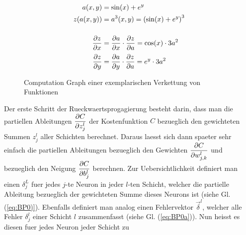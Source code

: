 \begin{figure}[h!]
  \begin{minipage}[h!]{0.5\textwidth}
    \centering

  \end{minipage}
  \begin{minipage}[h!]{0.5\textwidth}
    \begin{align*} %
      a(x,y) &= \sin(x) + e^y \\
      z(a(x,y)) &= a^3(x,y) = \left(\sin(x) + e^y\right)^3 \\[3ex]
      \partderiv{z}{x} &= \partderiv{a}{x} \cdot  \partderiv{z}{a} = \cos(x) \cdot 3a^2 \\[0.5ex]
      \partderiv{z}{y} &= \partderiv{a}{y} \cdot \partderiv{z}{a} = e^y \cdot 3a^2
    \end{align*}
  \end{minipage}

  \caption{Computation Graph einer exemplarischen Verkettung von Funktionen}
  \label{fig:computation_graph}
\end{figure}
\para{}
Der erste Schritt der Rueckwaertsprogagierung besteht darin, dass man die partiellen Ableitungen $\displaystyle\frac{\partial C}{\partial z_j^l}$
der Kostenfunktion $C$ bezueglich den gewichteten Summen $z_j^l$ aller Schichten
berechnet. Daraus laesst sich dann spaeter sehr einfach die partiellen Ableitungen
bezueglich den Gewichten $\displaystyle\frac{\partial C}{\partial w_{j,k}^l}$ und bezueglich den Neigung
$\displaystyle\frac{\partial C}{\partial b_j^l}$ berechnen.
\para{}
Zur Uebersichtlichkeit definiert man einen  $\delta_j^L$ fuer
jedes $j$-te Neuron in jeder $l$-ten Schicht, welcher die partielle Ableitung bezueglich der
gewichteten Summe dieses Neurons ist (siehe Gl. (\ref{eq:BP0)}). Ebenfalls definiert man analog einen Fehlervektor
$\vec{\delta}^l$, welcher alle Fehler $\delta_j^l$ einer Schicht $l$
zusammenfasst (siehe Gl. (\ref{eq:BP0a})). Nun heisst es diesen fuer jedes Neuron jeder Schicht zu
